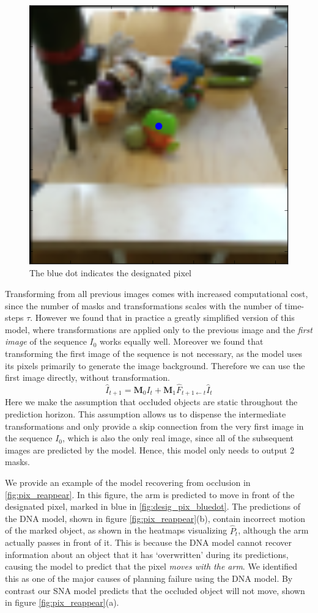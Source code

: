  \begin{figure}
 	\centering
 	\includegraphics[width=0.4\columnwidth]{images_sna/occlusionaware/img_desigpixb0.png}
 	\caption{The blue dot indicates the designated pixel}
 	\label{fig:desig_pix_bluedot}
 \end{figure}

Transforming from all previous images comes with increased computational cost, since the number of masks and transformations scales with the number of time-steps $\tau$. However we found that in practice a greatly simplified version of this model, where transformations are applied only to the previous image and the \emph{first image} of the sequence $I_0$ works equally well. Moreover we found that transforming the first image of the sequence is not necessary, as the model uses its pixels primarily to generate the image background. Therefore we can use the first image directly, without transformation. 
\begin{equation}
\hat{I}_{t+1} = \mathbf{M}_{0} I_t +  \mathbf{M}_{1} \hat{F}_{t+1 \leftarrow t} \hat{I}_t
\label{eqn:simplemodel}
\end{equation}
Here we make the assumption that occluded objects are static throughout the prediction horizon. This assumption allows us to dispense the intermediate transformations and only provide a skip connection from the very first image in the sequence $I_0$, which is also the only real image, since all of the subsequent images are predicted by the model. Hence, this model only needs to output 2 masks. 

We provide an example of the model recovering from occlusion in \autoref{fig:pix_reappear}. In this figure, the arm is predicted to move in front of the designated pixel, marked in blue in \autoref{fig:desig_pix_bluedot}. The predictions of the DNA model, shown in figure \autoref{fig:pix_reappear}(b), contain incorrect motion of the marked object, as shown in the heatmaps visualizing $\hat{P}_t$, although the arm actually passes in front of it. This is because the DNA model cannot recover information about an object that it has `overwritten' during its predictions, causing the model to predict that the pixel \emph{moves with the arm}. We identified this as one of the major causes of planning failure using the DNA model. By contrast our SNA model predicts that the occluded object will not move, shown in figure  \autoref{fig:pix_reappear}(a).

